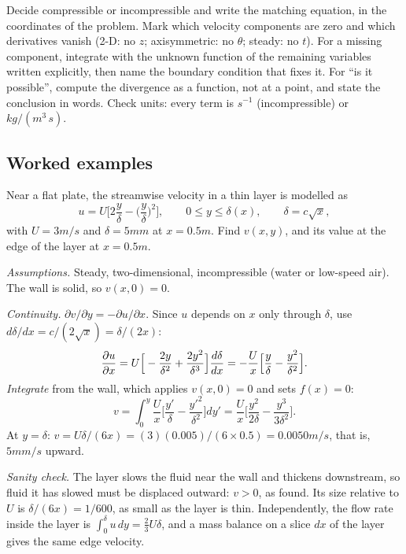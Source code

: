 \begin{firstmoves}
Decide compressible or incompressible and write the matching equation, in the coordinates of the problem. Mark which velocity components are zero and which derivatives vanish (2-D: no $z$; axisymmetric: no $\theta$; steady: no $t$). For a missing component, integrate with the unknown function of the remaining variables written explicitly, then name the boundary condition that fixes it. For ``is it possible'', compute the divergence as a function, not at a point, and state the conclusion in words. Check units: every term is $\unit{s^{-1}}$ (incompressible) or $\unit{kg/(m^3\,s)}$.
\end{firstmoves}

\subsection*{Worked examples}

\begin{example}
Near a flat plate, the streamwise velocity in a thin layer is modelled as
\[
u = U\Big[2\frac{y}{\delta} - \Big(\frac{y}{\delta}\Big)^2\Big],\qquad 0 \le y \le \delta(x),\qquad \delta = c\sqrt{x},
\]
with $U = 3\unit{m/s}$ and $\delta = 5\unit{mm}$ at $x = 0.5\unit{m}$. Find $v(x,y)$, and its value at the edge of the layer at $x = 0.5\unit{m}$.

\emph{Assumptions.} Steady, two-dimensional, incompressible (water or low-speed air). The wall is solid, so $v(x,0) = 0$.

\emph{Continuity.} $\partial v/\partial y = -\partial u/\partial x$. Since $u$ depends on $x$ only through $\delta$, use $d\delta/dx = c/(2\sqrt x) = \delta/(2x)$:
\[
\frac{\partial u}{\partial x} = U\Big[-\frac{2y}{\delta^2} + \frac{2y^2}{\delta^3}\Big]\frac{d\delta}{dx} = -\frac{U}{x}\Big[\frac{y}{\delta} - \frac{y^2}{\delta^2}\Big].
\]
\emph{Integrate} from the wall, which applies $v(x,0) = 0$ and sets $f(x) = 0$:
\[
v = \int_0^y \frac{U}{x}\Big[\frac{y'}{\delta} - \frac{y'^2}{\delta^2}\Big]dy' = \frac{U}{x}\Big[\frac{y^2}{2\delta} - \frac{y^3}{3\delta^2}\Big].
\]
At $y = \delta$: $v = U\delta/(6x) = (3)(0.005)/(6 \times 0.5) = 0.0050\unit{m/s}$, that is, $5\unit{mm/s}$ upward.

\emph{Sanity check.} The layer slows the fluid near the wall and thickens downstream, so fluid it has slowed must be displaced outward: $v > 0$, as found. Its size relative to $U$ is $\delta/(6x) = 1/600$, as small as the layer is thin. Independently, the flow rate inside the layer is $\int_0^\delta u\,dy = \tfrac{2}{3}U\delta$, and a mass balance on a slice $dx$ of the layer gives the same edge velocity.
\end{example}

